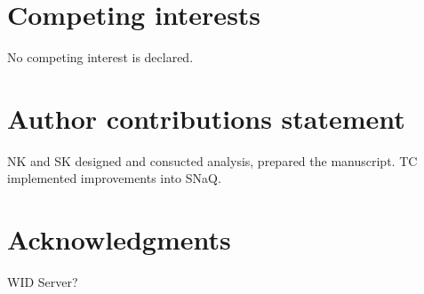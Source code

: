 \documentclass[unnumsec,webpdf,contemporary,large]{oup-authoring-template}%
\theoremstyle{thmstyleone}%
\theoremstyle{thmstyletwo}%
\theoremstyle{thmstylethree}%
\begin{document}
\section{Competing interests}
No competing interest is declared.

\section{Author contributions statement}
NK and SK designed and consucted analysis, prepared the manuscript. TC implemented improvements into SNaQ. 

\section{Acknowledgments}
WID Server? 

%
%


\end{document}
